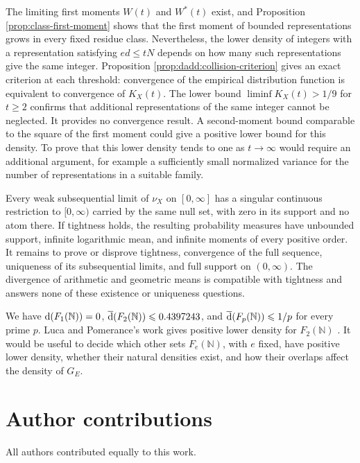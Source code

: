 \documentclass[11pt,letterpaper,reqno]{amsart}
\numberwithin{equation}{section}
\theoremstyle{remark}
\newcommand{\N}{\mathbb{N}}
\newcommand{\upperdens}{\overline{\textup{d}}}
\renewcommand{\leq}{\leqslant}
\renewcommand{\geq}{\geqslant}
\begin{document}
The limiting first moments $W(t)$ and $W^*(t)$ exist, and
Proposition \ref{prop:class-first-moment} shows that the first moment of
bounded representations grows in every fixed residue class. Nevertheless,
the lower density of integers with a representation satisfying $ed\leq tN$
depends on how many such representations give the same integer. Proposition \ref{prop:dadd:collision-criterion}
gives an exact criterion at each threshold: convergence of the empirical
distribution function is equivalent to convergence of $K_X(t)$.
The lower bound $\liminf K_X(t)>1/9$ for $t\geq2$ confirms that additional
representations of the same integer cannot be neglected. It provides no
convergence result. A second-moment bound comparable to the square of the
first moment could give a positive lower bound for this density.
To prove that this lower density tends to one as $t\to\infty$ would
require an additional argument, for example a sufficiently small
normalized variance for the number of representations in a suitable family.

Every weak subsequential limit of $\nu_X$ on $[0,\infty]$ has a singular
continuous restriction to $[0,\infty)$ carried by the same null set,
with zero in its support and no atom there.
If tightness holds, the resulting probability measures have unbounded support,
infinite logarithmic mean, and infinite moments of every positive order.
It remains to prove or disprove tightness, convergence of the full sequence,
uniqueness of its subsequential limits, and full support on $(0,\infty)$.
The divergence of arithmetic and geometric means is compatible with
tightness and answers none of these existence or uniqueness questions.

We have $\textup{d}(F_1(\N))=0$, $\upperdens(F_2(\N))\leq0.4397243$, and
$\upperdens(F_p(\N))\leq1/p$ for every prime $p$.
Luca and Pomerance's work gives positive lower density for $F_2(\N)$
\cite{LucaPomerance}. It would be useful to decide which other sets $F_e(\N)$, with $e$ fixed, have positive lower density, whether their natural
densities exist, and how their overlaps affect the density of $G_E$.


\section*{Author contributions}
All authors contributed equally to this work.

\end{document}
